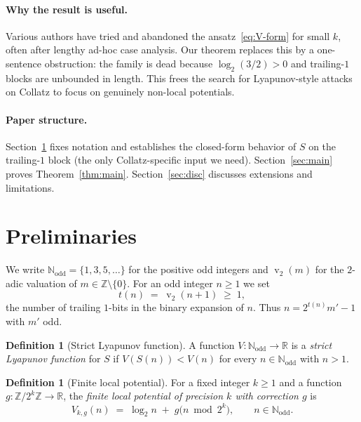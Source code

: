 \documentclass[11pt,a4paper]{article}
\theoremstyle{definition}
\newtheorem{definition}[theorem]{Definition}
\theoremstyle{remark}
\DeclareMathOperator{\val}{v}
\newcommand{\N}{\mathbb{N}}
\newcommand{\Z}{\mathbb{Z}}
\newcommand{\R}{\mathbb{R}}
\newcommand{\Nodd}{\N_{\mathrm{odd}}}
\begin{document}
\paragraph{Why the result is useful.}
Various authors have tried and abandoned the
ansatz~\eqref{eq:V-form} for small $k$, often after lengthy ad-hoc case
analysis.  Our theorem replaces this by a one-sentence obstruction:
the family is dead because $\log_2(3/2) > 0$ and trailing-$1$ blocks
are unbounded in length.  This frees the search for
Lyapunov-style attacks on Collatz to focus on genuinely
non-local potentials.

\paragraph{Paper structure.}
Section~\ref{sec:prelim} fixes notation and establishes the closed-form
behavior of $S$ on the trailing-$1$ block (the only Collatz-specific
input we need).  Section~\ref{sec:main} proves
Theorem~\ref{thm:main}.  Section~\ref{sec:disc} discusses extensions and
limitations.

\section{Preliminaries}\label{sec:prelim}

We write $\Nodd = \{1, 3, 5, \dots\}$ for the positive odd integers and
$\val_2(m)$ for the $2$-adic valuation of $m \in \Z \setminus \{0\}$.
For an odd integer $n \geq 1$ we set
\[
  t(n) \;=\; \val_2(n + 1) \;\geq\; 1,
\]
the number of trailing $1$-bits in the binary expansion of $n$.  Thus
$n = 2^{t(n)} m' - 1$ with $m'$ odd.

\begin{definition}[Strict Lyapunov function]\label{def:lyap}
A function $V \colon \Nodd \to \R$ is a \emph{strict Lyapunov function}
for $S$ if $V(S(n)) < V(n)$ for every $n \in \Nodd$ with $n > 1$.
\end{definition}

\begin{definition}[Finite local potential]\label{def:loc-pot}
For a fixed integer $k \geq 1$ and a function
$g \colon \Z / 2^k \Z \to \R$, the \emph{finite local potential of
precision $k$ with correction $g$} is
\[
  V_{k, g}(n) \;=\; \log_2 n \;+\; g\bigl(n \bmod 2^k\bigr),
  \qquad n \in \Nodd.
\]
\end{definition}
\end{document}
